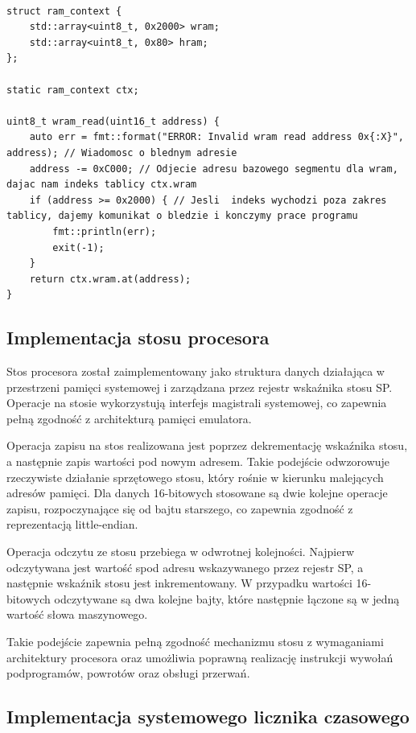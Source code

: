 \documentclass{article}
\begin{document}
\begin{lstlisting}[style=cpp,caption={Fragment implementacji pamięci operacyjnej},label={lst:ram}]

struct ram_context {
	std::array<uint8_t, 0x2000> wram;
	std::array<uint8_t, 0x80> hram;
};

static ram_context ctx;

uint8_t wram_read(uint16_t address) {
	auto err = fmt::format("ERROR: Invalid wram read address 0x{:X}", address); // Wiadomosc o blednym adresie
	address -= 0xC000; // Odjecie adresu bazowego segmentu dla wram, dajac nam indeks tablicy ctx.wram
	if (address >= 0x2000) { // Jesli  indeks wychodzi poza zakres tablicy, dajemy komunikat o bledzie i konczymy prace programu
		fmt::println(err);
		exit(-1);
	}
	return ctx.wram.at(address);
}
\end{lstlisting}


\subsection{Implementacja stosu procesora}

Stos procesora został zaimplementowany jako struktura danych działająca w przestrzeni pamięci systemowej i zarządzana przez rejestr wskaźnika stosu SP. Operacje na stosie wykorzystują interfejs magistrali systemowej, co zapewnia pełną zgodność z architekturą pamięci emulatora.

Operacja zapisu na stos realizowana jest poprzez dekrementację wskaźnika stosu, a następnie zapis wartości pod nowym adresem. Takie podejście odwzorowuje rzeczywiste działanie sprzętowego stosu, który rośnie w kierunku malejących adresów pamięci. Dla danych 16-bitowych stosowane są dwie kolejne operacje zapisu, rozpoczynające się od bajtu starszego, co zapewnia zgodność z reprezentacją little-endian.

Operacja odczytu ze stosu przebiega w odwrotnej kolejności. Najpierw odczytywana jest wartość spod adresu wskazywanego przez rejestr SP, a następnie wskaźnik stosu jest inkrementowany. W przypadku wartości 16-bitowych odczytywane są dwa kolejne bajty, które następnie łączone są w jedną wartość słowa maszynowego.

Takie podejście zapewnia pełną zgodność mechanizmu stosu z wymaganiami architektury procesora oraz umożliwia poprawną realizację instrukcji wywołań podprogramów, powrotów oraz obsługi przerwań.

\subsection{Implementacja systemowego licznika czasowego}
\end{document}
